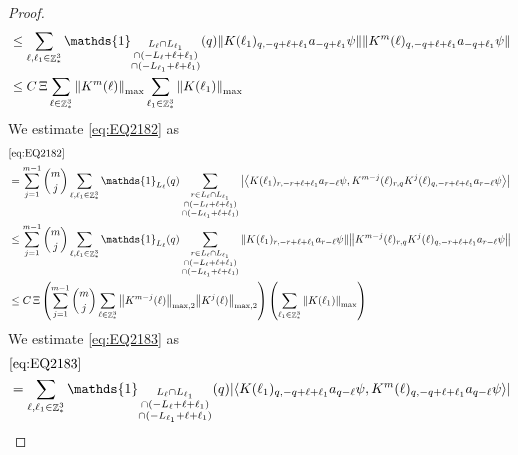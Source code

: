 \documentclass[sn-mathphys, Numbered ,a4paper]{sn-jnl}%
\DeclareMathOperator{\Z}{\mathbb{Z}}
\newcommand{\eva}[1]{\left\langle #1 \right\rangle}
\theoremstyle{plain}
\theoremstyle{definition}
\theoremstyle{remark}
\theoremstyle{plain}
\theoremstyle{definition}
\theoremstyle{remark}
\begin{document}
\begin{proof}
\begin{align}
	&\leq \sum\limits_{\ell, \ell_1\in \Z^3_*} \mathds{1}_{\substack{L_{\ell}\cap L_{\ell_1}\\\cap (-L_{\ell}+\ell+\ell_1) \\ \cap (-L_{\ell_1}+\ell+\ell_1)}}(q) \norm{ K(\ell_1)_{q,-q+\ell+\ell_1} a_{-q+\ell_1} \psi}\norm{ K^m(\ell)_{q,-q+\ell+\ell_1} a_{-q+\ell_1} \psi }\nonumber\\
	&\leq C\,\Xi \sum\limits_{\ell \in \Z^3_*} \norm{K^m(\ell)}_{\mathrm{max}} \sum\limits_{\ell_1 \in \Z^3_*} \norm{K(\ell_1)}_{\mathrm{max}}   \label{eq:estEQ2181}
\end{align}
We estimate \eqref{eq:EQ2182} as
\begin{align}
	& \eqref{eq:EQ2182}\nonumber\\
	&= \sum\limits_{j=1}^{m-1} {{m}\choose j} \sum\limits_{\ell, \ell_1\in \Z^3_*}\mathds{1}_{L_{\ell}}(q) \sum\limits_{\substack{r\in L_{\ell} \cap L_{\ell_1}\\\cap (-L_{\ell}+\ell+\ell_1) \\ \cap (-L_{\ell_1}+\ell+\ell_1)}}  \abs{\eva{ K(\ell_1)_{r,-r+\ell+\ell_1} a_{r-\ell} \psi, K^{m-j}(\ell)_{r,q} K^j(\ell)_{q,-r+\ell+\ell_1} a_{r-\ell} \psi }}\nonumber\\
	&\leq \sum\limits_{j=1}^{m-1} {{m}\choose j} \sum\limits_{\ell, \ell_1\in \Z^3_*}\mathds{1}_{L_{\ell}}(q) \sum\limits_{\substack{r\in L_{\ell} \cap L_{\ell_1}\\\cap (-L_{\ell}+\ell+\ell_1) \\ \cap (-L_{\ell_1}+\ell+\ell_1)}}  \norm{ K(\ell_1)_{r,-r+\ell+\ell_1} a_{r-\ell} \psi} \norm{ K^{m-j}(\ell)_{r,q} K^j(\ell)_{q,-r+\ell+\ell_1} a_{r-\ell} \psi} \nonumber\\
	&\leq C\,\Xi \left(\sum\limits_{j=1}^{m-1} {{m}\choose j} \sum\limits_{ \ell\in \Z^3_*} \norm{K^{m-j}(\ell)}_{\mathrm{max,2}} \norm{K^j(\ell)}_{\mathrm{max,2}}\right) \left(\sum\limits_{ \ell_1\in \Z^3_*}\norm{ K(\ell_1)}_{\mathrm{max}} \right) \label{eq:estEQ2182}
\end{align}
We estimate \eqref{eq:EQ2183} as
\begin{align}
	& \eqref{eq:EQ2183}\nonumber\\
	&= \sum\limits_{\ell, \ell_1\in \Z^3_*} \mathds{1}_{\substack{L_{\ell}\cap L_{\ell_1}\\\cap (-L_{\ell}+\ell+\ell_1) \\ \cap (-L_{\ell_1}+\ell+\ell_1)}} (q) \abs{\eva{K(\ell_1)_{q,-q+\ell+\ell_1} a_{q-\ell} \psi, K^m(\ell)_{q,-q+\ell+\ell_1} a_{q-\ell}\psi }}\nonumber\\

\end{align}
\end{proof}
\end{document}
